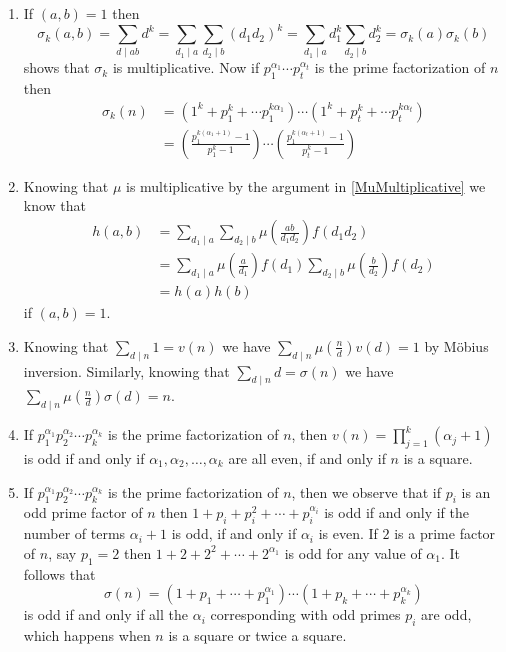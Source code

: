 \documentclass[12pt]{article}
\begin{document}
\begin{enumerate}
\item %
If $\left(a,b\right)=1$ then
\[\sigma_k\left(a,b\right)
=\sum_{d\mid ab}d^k=\sum_{d_1\mid a}\sum_{d_2\mid b}
\left(d_1d_2\right)^k
=\sum_{d_1\mid a}d_1^k\sum_{d_2\mid b}d_2^k
=\sigma_k\left(a\right)\sigma_k\left(b\right)\]
shows that $\sigma_k$ is multiplicative.
Now if $p_1^{\alpha_1}\cdots p_t^{\alpha_t}$
is the prime factorization of $n$ then
\begin{align*}
\sigma_k\left(n\right)
&=\left(1^k+p_1^k+\cdots p_1^{k\alpha_1}\right)
\cdots\left(1^k+p_t^k+\cdots p_t^{k\alpha_t}\right)\\
&=\left(\frac{p_1^{k\left(\alpha_1+1\right)}-1}{p_1^k-1}\right)
\cdots\left(\frac{p_1^{k\left(\alpha_t+1\right)}-1}{p_t^k-1}\right)
\end{align*}

\item %
Knowing that $\mu$ is multiplicative by the argument
in \autoref{MuMultiplicative} we know that
\begin{align*}
h\left(a,b\right)
&=\sum_{d_1\mid a}\sum_{d_2\mid b}
\mu\left(\frac{ab}{d_1d_2}\right)f\left(d_1d_2\right)\\
&=\sum_{d_1\mid a}
\mu\left(\frac{a}{d_1}\right)f\left(d_1\right)
\sum_{d_2\mid b}
\mu\left(\frac{b}{d_2}\right)f\left(d_2\right)\\
&=h\left(a\right)h\left(b\right)
\end{align*}
if $\left(a,b\right)=1$.

\item %
Knowing that $\sum_{d\mid n}1=v\left(n\right)$
we have $\sum_{d\mid n}\mu\left(\frac{n}{d}\right)v\left(d\right)=1$
by M\"obius inversion.
Similarly, knowing that $\sum_{d\mid n}d=\sigma\left(n\right)$
we have $\sum_{d\mid n}\mu\left(\frac{n}{d}\right)\sigma\left(d\right)=n$.

\item %
If $p_1^{\alpha_1}p_2^{\alpha_2}\cdots p_k^{\alpha_k}$
is the prime factorization of $n$, then
$v\left(n\right)=\prod_{j=1}^k\left(\alpha_j+1\right)$
is odd if and only if $\alpha_1,\alpha_2,\ldots,\alpha_k$
are all even, if and only if $n$ is a square.

\item %
If $p_1^{\alpha_1}p_2^{\alpha_2}\cdots p_k^{\alpha_k}$
is the prime factorization of $n$, then
we observe that if $p_i$ is an odd prime factor of $n$ then
$1+p_i+p_i^2+\cdots+p_i^{\alpha_i}$ is odd if and only
if the number of terms
$\alpha_i+1$ is odd, if and only if $\alpha_i$ is even.
If $2$ is a prime factor of $n$, say $p_1=2$ then
$1+2+2^2+\cdots +2^{\alpha_1}$ is odd for any value of $\alpha_1$.
It follows that
\[\sigma\left(n\right)=\left(1+p_1+\cdots+p_1^{\alpha_1}\right)
\cdots\left(1+p_k+\cdots+p_k^{\alpha_k}\right)\]
is odd if and only if
all the $\alpha_i$ corresponding with odd primes $p_i$
are odd, which happens when $n$ is a square or twice a square.


\end{enumerate}
\end{document}

